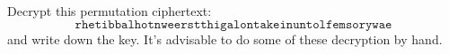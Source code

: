   Decrypt this permutation ciphertext:
  \[
    \texttt{rhetibbalhotnweerstthigalontakeinuntolfemsorywae}
  \]
  and write down the key.
  It's advisable to do some of these decryption by hand.


